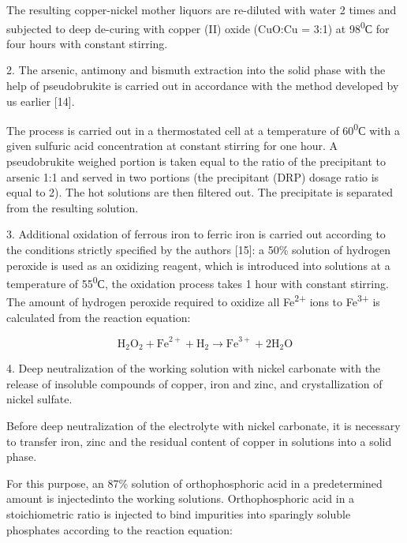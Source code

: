 \begin{multicols}{2}
The resulting copper-nickel mother liquors are re-diluted with water 2
times and subjected to deep de-curing with copper (II) oxide (CuO:Cu =
3:1) at 98\textsuperscript{0}С for four hours with constant stirring.

2. The arsenic, antimony and bismuth extraction into the solid phase
with the help of pseudobrukite is carried out in accordance with the
method developed by us earlier {[}14{]}.

The process is carried out in a thermostated cell at a temperature of
60\textsuperscript{0}С with a given sulfuric acid concentration at
constant stirring for one hour. A pseudobrukite weighed portion is taken
equal to the ratio of the precipitant to arsenic 1:1 and served in two
portions (the precipitant (DRP) dosage ratio is equal to 2). The hot
solutions are then filtered out. The precipitate is separated from the
resulting solution.

3. Additional oxidation of ferrous iron to ferric iron is carried out
according to the conditions strictly specified by the authors {[}15{]}:
a 50\% solution of hydrogen peroxide is used as an oxidizing reagent,
which is introduced into solutions at a temperature of
55\textsuperscript{0}С, the oxidation process takes 1 hour with constant
stirring. The amount of hydrogen peroxide required to oxidize all
Fe\textsuperscript{2+} ions to Fe\textsuperscript{3+} is calculated from
the reaction equation:
\end{multicols}

\begin{equation}
\text{H}_2\text{O}_2 + \text{Fe}^{2+} + \text{H}_2 \to \text{Fe}^{3+} + 2\text{H}_2\text{O}
\end{equation}

\begin{multicols}{2}
4. Deep neutralization of the working solution with nickel carbonate
with the release of insoluble compounds of copper, iron and zinc, and
crystallization of nickel sulfate.

Before deep neutralization of the electrolyte with nickel carbonate, it
is necessary to transfer iron, zinc and the residual content of copper
in solutions into a solid phase.

For this purpose, an 87\% solution of orthophosphoric acid in a
predetermined amount is injectedinto the working solutions.
Orthophosphoric acid in a stoichiometric ratio is injected to bind
impurities into sparingly soluble phosphates according to the reaction
equation:
\end{multicols}

